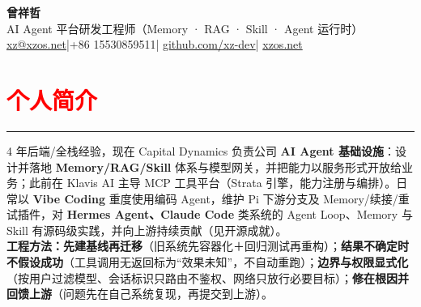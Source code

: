 \documentclass[10pt,a4paper]{article}
\begin{document}
\begin{center}
	{\LARGE\textbf{曾祥哲}}\\[4pt]
	{\large AI Agent 平台研发工程师（Memory · RAG · Skill · Agent 运行时）}\\[5pt]
	\small
	\href{mailto:xz@xzos.net}{xz@xzos.net}\quad |\quad +86 15530859511\quad |\quad
	\href{https://github.com/xz-dev}{github.com/xz-dev}\quad |\quad
	\href{https://xzos.net}{xzos.net}
\end{center}

\section*{\textcolor{red}{个人简介}}
\vspace*{-4ex}
\noindent\textcolor{red}{\rule{\linewidth}{0.4pt}}
4 年后端/全栈经验，现在 Capital Dynamics 负责公司 \textbf{AI Agent 基础设施}：设计并落地 \textbf{Memory/RAG/Skill} 体系与模型网关，并把能力以服务形式开放给业务；此前在 Klavis AI 主导 MCP 工具平台（Strata 引擎，能力注册与编排）。日常以 \textbf{Vibe Coding} 重度使用编码 Agent，维护 Pi 下游分支及 Memory/续接/重试插件，对 \textbf{Hermes Agent、Claude Code} 类系统的 Agent Loop、Memory 与 Skill 有源码级实践，并向上游持续贡献（见开源成就）。\\
\textbf{工程方法：}\textbf{先建基线再迁移}（旧系统先容器化＋回归测试再重构）；\textbf{结果不确定时不假设成功}（工具调用无返回标为“效果未知”，不自动重跑）；\textbf{边界与权限显式化}（按用户过滤模型、会话标识只路由不鉴权、网络只放行必要目标）；\textbf{修在根因并回馈上游}（问题先在自己系统复现，再提交到上游）。
\end{document}
